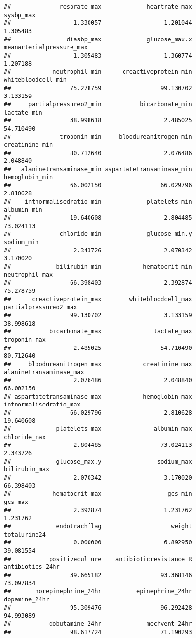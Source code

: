 \documentclass[
]{article}
\begin{document}
\begin{verbatim}
##              resprate_max             heartrate_max                 sysbp_max 
##                  1.330057                  1.201044                  1.305483 
##                diasbp_max             glucose_max.x  meanarterialpressure_max 
##                  1.305483                  1.360774                  1.207188 
##            neutrophil_min      creactiveprotein_min        whitebloodcell_min 
##                 75.278759                 99.130702                  3.133159 
##     partialpressureo2_min           bicarbonate_min               lactate_min 
##                 38.998618                  2.485025                 54.710490 
##              troponin_min     bloodureanitrogen_min            creatinine_min 
##                 80.712640                  2.076486                  2.048840 
##   alaninetransaminase_min aspartatetransaminase_min            hemoglobin_min 
##                 66.002150                 66.029796                  2.810628 
##    intnormalisedratio_min             platelets_min               albumin_min 
##                 19.640608                  2.804485                 73.024113 
##              chloride_min             glucose_min.y                sodium_min 
##                  2.343726                  2.070342                  3.170020 
##             bilirubin_min            hematocrit_min            neutrophil_max 
##                 66.398403                  2.392874                 75.278759 
##      creactiveprotein_max        whitebloodcell_max     partialpressureo2_max 
##                 99.130702                  3.133159                 38.998618 
##           bicarbonate_max               lactate_max              troponin_max 
##                  2.485025                 54.710490                 80.712640 
##     bloodureanitrogen_max            creatinine_max   alaninetransaminase_max 
##                  2.076486                  2.048840                 66.002150 
## aspartatetransaminase_max            hemoglobin_max    intnormalisedratio_max 
##                 66.029796                  2.810628                 19.640608 
##             platelets_max               albumin_max              chloride_max 
##                  2.804485                 73.024113                  2.343726 
##             glucose_max.y                sodium_max             bilirubin_max 
##                  2.070342                  3.170020                 66.398403 
##            hematocrit_max                   gcs_min                   gcs_max 
##                  2.392874                  1.231762                  1.231762 
##             endotrachflag                    weight              totalurine24 
##                  0.000000                  6.892950                 39.081554 
##           positiveculture    antibioticresistance_R          antibiotics_24hr 
##                 39.665182                 93.368146                 73.097834 
##       norepinephrine_24hr          epinephrine_24hr             dopamine_24hr 
##                 95.309476                 96.292428                 94.993089 
##           dobutamine_24hr             mechvent_24hr 
##                 98.617724                 71.190293
\end{verbatim}
\end{document}
